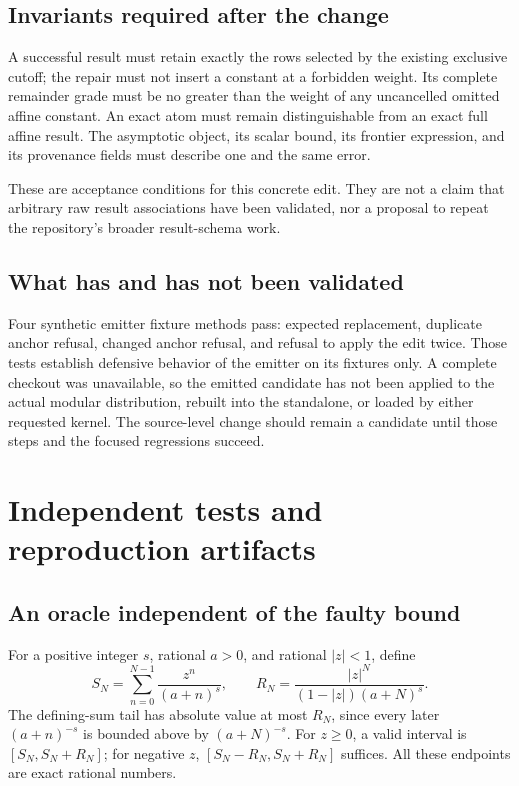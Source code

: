 \documentclass[11pt,letterpaper]{article}
\begin{document}
\subsection{Invariants required after the change}
A successful result must retain exactly the rows selected by the existing
exclusive cutoff; the repair must not insert a constant at a forbidden weight.
Its complete remainder grade must be no greater than the weight of any
uncancelled omitted affine constant. An exact atom must remain distinguishable
from an exact full affine result. The asymptotic object, its scalar bound, its
frontier expression, and its provenance fields must describe one and the same
error.

These are acceptance conditions for this concrete edit. They are not a claim
that arbitrary raw result associations have been validated, nor a proposal to
repeat the repository's broader result-schema work.

\subsection{What has and has not been validated}
Four synthetic emitter fixture methods pass: expected replacement, duplicate
anchor refusal, changed anchor refusal, and refusal to apply the edit twice.
Those tests establish defensive behavior of the emitter on its fixtures only.
A complete checkout was unavailable, so the emitted candidate has not been
applied to the actual modular distribution, rebuilt into the standalone, or
loaded by either requested kernel. The source-level change should remain a
candidate until those steps and the focused regressions succeed.

\section{Independent tests and reproduction artifacts}
\subsection{An oracle independent of the faulty bound}
For a positive integer $s$, rational $a>0$, and rational $|z|<1$, define
\[
 S_N=\sum_{n=0}^{N-1}\frac{z^n}{(a+n)^s},\qquad
 R_N=\frac{|z|^N}{(1-|z|)(a+N)^s}.
\]
The defining-sum tail has absolute value at most $R_N$, since every later
$(a+n)^{-s}$ is bounded above by $(a+N)^{-s}$. For $z\ge0$, a valid interval is
$[S_N,S_N+R_N]$; for negative $z$, $[S_N-R_N,S_N+R_N]$ suffices.
All these endpoints are exact rational numbers.
\end{document}
